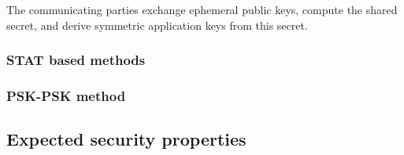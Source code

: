 The communicating parties exchange ephemeral public keys, compute the shared secret, and derive symmetric application keys from this secret.



\subsubsection{STAT based methods}
\subsubsection{PSK-PSK method}

\subsection{Expected security properties}
